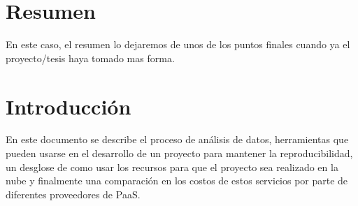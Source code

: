 \documentclass[12pt,a4paper,openright]{article}
\begin{document}

\section{Resumen} %

\textcolor{BlueGreen}{
En este caso, el resumen lo dejaremos de unos de los puntos finales cuando ya el proyecto/tesis haya tomado mas forma.
}


\newpage


\tableofcontents %


\newpage


\section{Introducci\'on}

En este documento se describe el proceso de análisis de datos, herramientas que pueden usarse en el desarrollo de un proyecto para mantener la reproducibilidad, un desglose de como usar los recursos para que el proyecto sea realizado en la nube y finalmente una comparación en los costos de estos servicios por parte de diferentes proveedores de PaaS.

\end{document}
